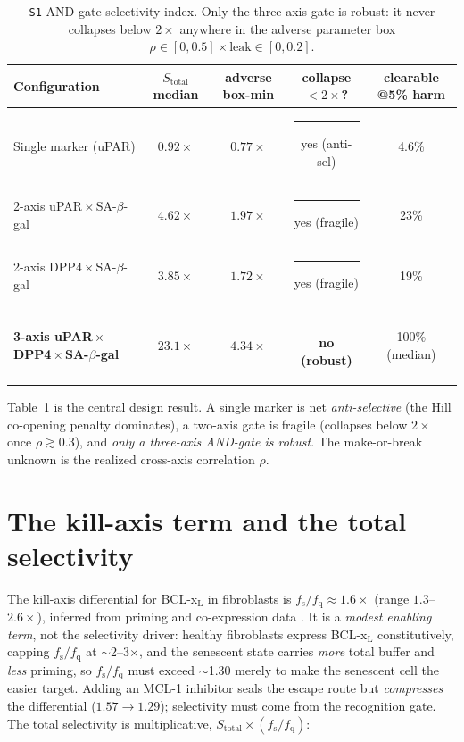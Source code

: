 \documentclass[11pt,a4paper]{article}
\newcommand{\tierdisc}[1]{\textcolor{#1}{\rule[0.05ex]{1.0ex}{1.0ex}}}
\newcommand{\tierGreen}{\tierdisc{green!60!black}}
\newcommand{\tierOrange}{\tierdisc{orange!90!black}}
\newcommand{\tierRed}{\tierdisc{red!80!black}}
\newcommand{\fs}{f_{\mathrm{s}}}
\newcommand{\fq}{f_{\mathrm{q}}}
\newcommand{\Stot}{S_{\mathrm{total}}}
\begin{document}
\begin{table}[t]
\centering
\caption{\texttt{S1} AND-gate selectivity index. Only the three-axis gate is
robust: it never collapses below $2\times$ anywhere in the adverse parameter box
$\rho\in[0,0.5]\times\text{leak}\in[0,0.2]$.}
\label{tab:s1}
\small
\begin{tabular}{@{}lcccc@{}}
\toprule
Configuration & $\Stot$ median & adverse box-min & collapse $<2\times$? & clearable @5\% harm \\
\midrule
Single marker (uPAR) & $0.92\times$ & $0.77\times$ & \tierRed{} yes (anti-sel) & 4.6\% \\
2-axis uPAR\,$\times$\,SA-$\beta$-gal & $4.62\times$ & $1.97\times$ & \tierOrange{} yes (fragile) & 23\% \\
2-axis DPP4\,$\times$\,SA-$\beta$-gal & $3.85\times$ & $1.72\times$ & \tierOrange{} yes (fragile) & 19\% \\
\textbf{3-axis uPAR\,$\times$\,DPP4\,$\times$\,SA-$\beta$-gal} & $\mathbf{23.1\times}$ & $\mathbf{4.34\times}$ & \tierGreen{} \textbf{no (robust)} & 100\% (median) \\
\bottomrule
\end{tabular}
\end{table}

Table~\ref{tab:s1} is the central design result. A single marker is net
\emph{anti-selective} (the Hill co-opening penalty dominates), a two-axis gate
is fragile (collapses below $2\times$ once $\rho\gtrsim0.3$), and \emph{only a
three-axis AND-gate is robust}. The make-or-break unknown is the realized
cross-axis correlation $\rho$.

\section{The kill-axis term and the total selectivity}
\label{sec:total}

The kill-axis differential for BCL-x$_{\mathrm L}$ in fibroblasts is
$\fs/\fq\approx1.6\times$ (range $1.3$--$2.6\times$), inferred from priming and
co-expression data \citep{sotogamez2024,yosef2016,zhu2016,shen2024}. It is a
\emph{modest enabling term}, not the selectivity driver: healthy fibroblasts
express BCL-x$_{\mathrm L}$ constitutively, capping $\fs/\fq$ at $\sim$2--3$\times$,
and the senescent state carries \emph{more} total buffer and \emph{less}
priming, so $\fs/\fq$ must exceed $\sim$1.30 merely to make the senescent cell
the easier target. Adding an MCL-1 inhibitor seals the escape route but
\emph{compresses} the differential ($1.57\to1.29$); selectivity must come from
the recognition gate. The total selectivity is multiplicative,
$\Stot\times(\fs/\fq)$:
\end{document}
